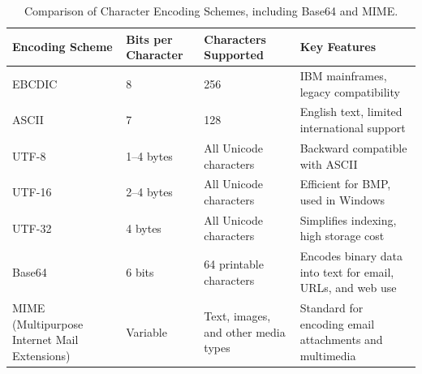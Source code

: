 \begin{table}[h!]
\centering
\renewcommand{\arraystretch}{1.3} %
\setlength{\tabcolsep}{5pt} %
\begin{tabular}{|p{3.2cm}|p{2cm}|p{3.5cm}|p{5cm}|} %
\hline
\textbf{Encoding Scheme} & \textbf{Bits per Character} & \textbf{Characters Supported} & \textbf{Key Features} \\ \hline
EBCDIC & 8 & 256 & IBM mainframes, legacy compatibility \\ \hline
ASCII & 7 & 128 & English text, limited international support \\ \hline
UTF-8 & 1--4 bytes & All Unicode characters & Backward compatible with ASCII \\ \hline
UTF-16 & 2--4 bytes & All Unicode characters & Efficient for BMP, used in Windows \\ \hline
UTF-32 & 4 bytes & All Unicode characters & Simplifies indexing, high storage cost \\ \hline
Base64 & 6 bits & 64 printable characters & Encodes binary data into text for email, URLs, and web use \\ \hline
MIME (Multipurpose Internet Mail Extensions) & Variable & Text, images, and other media types & Standard for encoding email attachments and multimedia \\ \hline
\end{tabular}
\caption{Comparison of Character Encoding Schemes, including Base64 and MIME.}
\label{tab:char_encodings}
\end{table}

